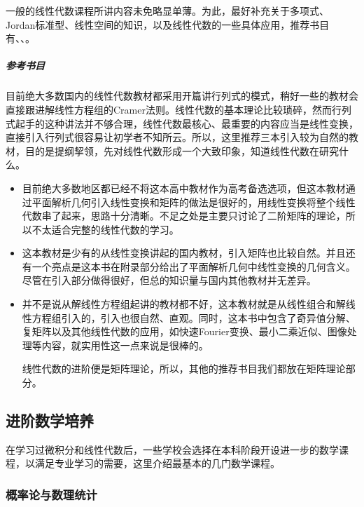 一般的线性代数课程所讲内容未免略显单薄。为此，最好补充关于多项式、Jordan标准型、线性空间的知识，以及线性代数的一些具体应用，推荐书目有\cite[线性代数：第5版]{线性代数5}、\cite[线性代数应该这样学]{阿克斯勒杜现昆2016线性代数应该这样学}、\cite[高等代数学]{张贤科2004高等代数学}。

\subparagraph{参考书目}\mbox{}

目前绝大多数国内的线性代数教材都采用开篇讲行列式的模式，稍好一些的教材会直接跟进解线性方程组的Cramer法则。线性代数的基本理论比较琐碎，然而行列式起手的这种讲法并不够合理，线性代数最核心、最重要的内容应当是线性变换，直接引入行列式很容易让初学者不知所云。所以，这里推荐三本引入较为自然的教材，目的是提纲挈领，先对线性代数形成一个大致印象，知道线性代数在研究什么。

\begin{itemize}
	\item \cite[普通高中课程标准实验教科书\ 数学\ 选修4-2\ A版\ 矩阵与变换]{矩阵与变换}

	      目前绝大多数地区都已经不将这本高中教材作为高考备选选项，但这本教材通过平面解析几何引入线性变换和矩阵的做法是很好的，用线性变换将整个线性代数串了起来，思路十分清晰。不足之处是主要只讨论了二阶矩阵的理论，所以不太适合完整的线性代数的学习。
	\item \cite[线性代数]{线性代数}

	      这本教材是少有的从线性变换讲起的国内教材，引入矩阵也比较自然。并且还有一个亮点是这本书在附录部分给出了平面解析几何中线性变换的几何含义。尽管在引入部分做得很好，但总的知识量与国内其他教材并无差异。

	\item \cite[线性代数：第5版]{线性代数5}

	      并不是说从解线性方程组起讲的教材都不好，这本教材就是从线性组合和解线性方程组引入的，引入也很自然、直观。同时，这本书中包含了奇异值分解、复矩阵以及其他线性代数的应用，如快速Fourier变换、最小二乘近似、图像处理等内容，就实用性这一点来说是很棒的。

	      线性代数的进阶便是矩阵理论，所以，其他的推荐书目我们都放在矩阵理论部分。
\end{itemize}
\subsection{进阶数学培养}

在学习过微积分和线性代数后，一些学校会选择在本科阶段开设进一步的数学课程，以满足专业学习的需要，这里介绍最基本的几门数学课程。

\subsubsection{概率论与数理统计}

